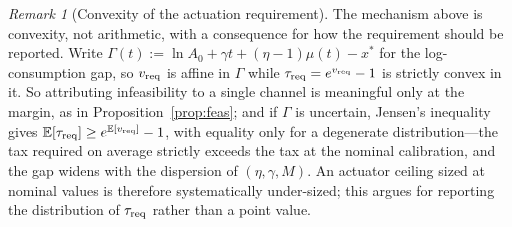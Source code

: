 \documentclass[conference,letterpaper,10pt]{IEEEtran}
\theoremstyle{plain}
\theoremstyle{remark}
\newtheorem{remark}{Remark}
\newcommand{\xt}{x^{\ast}}
\begin{document}
\begin{remark}[Convexity of the actuation requirement]
\label{rem:convex}
The mechanism above is convexity, not arithmetic, with a consequence
for how the requirement should be reported. Write
$\Gamma(t):=\ln A_0+\gamma t+(\eta-1)\mu(t)-\xt$ for the
log-consumption gap, so $v_{\rm req}$ is affine in $\Gamma$ while
$\tau_{\rm req}=e^{v_{\rm req}}-1$ is strictly convex in it. So
attributing infeasibility to a single channel is meaningful only at
the margin, as in Proposition~\ref{prop:feas}; and if $\Gamma$ is
uncertain, Jensen's inequality gives
$\mathbb{E}[\tau_{\rm req}]\ge e^{\mathbb{E}[v_{\rm req}]}-1$, with
equality only for a degenerate distribution---the tax required on
average strictly exceeds the tax at the nominal calibration, and the
gap widens with the dispersion of $(\eta,\gamma,M)$. An actuator
ceiling sized at nominal values is therefore systematically
under-sized; this argues for reporting the distribution of
$\tau_{\rm req}$ rather than a point value.
\end{remark}
\end{document}
